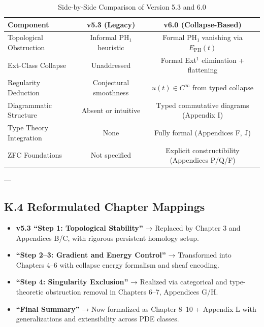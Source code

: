 \documentclass[11pt]{article}
\begin{document}
\begin{table}[h!]
\centering
\begin{tabular}{|l|c|c|}
\hline
\textbf{Component} & \textbf{v5.3 (Legacy)} & \textbf{v6.0 (Collapse-Based)} \\
\hline
Topological Obstruction & Informal PH₁ heuristic & Formal PH₁ vanishing via \( E_{\mathrm{PH}}(t) \) \\
Ext-Class Collapse       & Unaddressed           & Formal Ext$^1$ elimination + flattening \\
Regularity Deduction     & Conjectural smoothness & \( u(t) \in C^\infty \) from typed collapse \\
Diagrammatic Structure   & Absent or intuitive    & Typed commutative diagrams (Appendix I) \\
Type Theory Integration  & None                   & Fully formal (Appendices F, J) \\
ZFC Foundations          & Not specified          & Explicit constructibility (Appendices P/Q/F) \\
\hline
\end{tabular}
\caption{Side-by-Side Comparison of Version 5.3 and 6.0}
\end{table}

---

\subsection*{K.4 Reformulated Chapter Mappings}

\begin{itemize}
  \item \textbf{v5.3 “Step 1: Topological Stability”}  
    → Replaced by Chapter 3 and Appendices B/C, with rigorous persistent homology setup.

  \item \textbf{“Step 2–3: Gradient and Energy Control”}  
    → Transformed into Chapters 4–6 with collapse energy formalism and sheaf encoding.

  \item \textbf{“Step 4: Singularity Exclusion”}  
    → Realized via categorical and type-theoretic obstruction removal in Chapters 6–7, Appendices G/H.

  \item \textbf{“Final Summary”}  
    → Now formalized as Chapter 8–10 + Appendix L with generalizations and extensibility across PDE classes.
\end{itemize}
\end{document}
